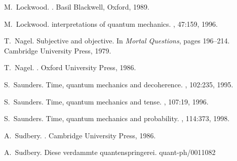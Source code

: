\documentclass[12pt,a4paper,reqno]{article}
\renewcommand{\(}{\left(}
\renewcommand{\)}{\right)}
\newcommand{\<}{\langle}
\renewcommand{\>}{\rangle}
\theoremstyle{plain} %
\theoremstyle{definition}
\theoremstyle{remark}
\begin{document}
\begin{thebibliography}{10}
M.~Lockwood.
.
\newblock Basil Blackwell, Oxford, 1989.

M.~Lockwood.
 interpretations of quantum mechanics.
, 47:159, 1996.

T.~Nagel.
\newblock Subjective and objective.
\newblock In {\em Mortal Questions}, pages 196--214. Cambridge University
  Press, 1979.

T.~Nagel.
.
\newblock Oxford University Press, 1986.

S.~Saunders.
\newblock Time, quantum mechanics and decoherence.
, 102:235, 1995.

S.~Saunders.
\newblock Time, quantum mechanics and tense.
, 107:19, 1996.

S.~Saunders.
\newblock Time, quantum mechanics and probability.
, 114:373, 1998.

A.~Sudbery.
.
\newblock Cambridge University Press, 1986.

A.~Sudbery.
\newblock Diese verdammte quantenspringerei.
\newblock quant-ph/0011082

\end{thebibliography}
\end{document}
